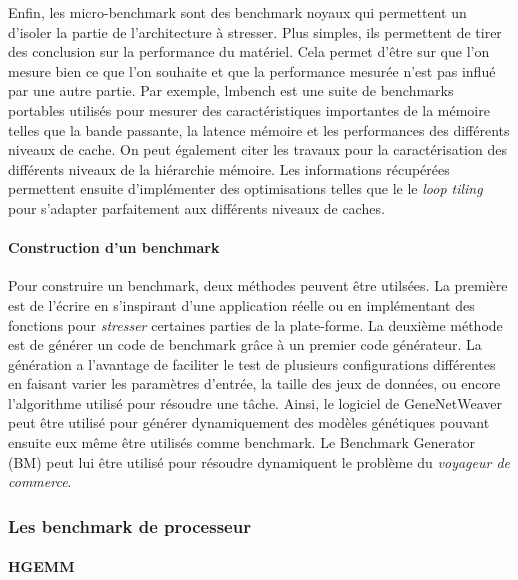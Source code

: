     Enfin, les micro-benchmark sont des benchmark noyaux qui permettent un d’isoler la partie de l’architecture à stresser. Plus simples, ils permettent de tirer des conclusion sur la performance du matériel. Cela permet d’être sur que l’on mesure bien ce que l’on souhaite et que la performance mesurée n’est pas influé par une autre partie.
    Par exemple, lmbench \cite{HPC:lmbench} est une suite de benchmarks portables utilisés pour mesurer des caractéristiques importantes de la mémoire telles que la bande passante, la latence mémoire et les performances des différents niveaux de cache.
    On peut également citer les travaux \cite{Saavedra1995, gonzalez2010servet} pour la caractérisation des différents niveaux de la hiérarchie mémoire. Les informations récupérées permettent ensuite d'implémenter des optimisations telles que le le \textit{loop tiling} pour s'adapter parfaitement aux différents niveaux de caches.



\paragraph{Construction d'un benchmark} Pour construire un benchmark, deux méthodes peuvent être utilsées. 
    La première est de l'écrire en s'inspirant d'une application réelle ou en implémentant des fonctions pour \textit{stresser} certaines parties de la plate-forme.
    La deuxième méthode est de générer un code de benchmark grâce à un premier code générateur. La génération a l'avantage de faciliter le test de plusieurs configurations différentes en faisant varier les paramètres d'entrée, la taille des jeux de données, ou encore l'algorithme utilisé pour résoudre une tâche. Ainsi, le logiciel de GeneNetWeaver \cite{schaffter2011genenetweaver} peut être utilisé pour générer dynamiquement des modèles génétiques pouvant ensuite eux même être utilisés comme benchmark. Le Benchmark Generator (BM) \cite{younes2003benchmark} peut lui être utilisé pour résoudre dynamiquent le problème du \textit{voyageur de commerce}.


\subsubsection{Les benchmark de processeur}


\paragraph{HGEMM}






